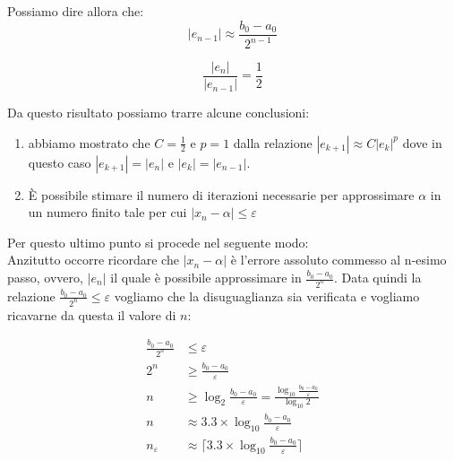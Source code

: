 \documentclass[12pt, a4paper]{book}
\theoremstyle{definition}
\begin{document}
\begin{flushleft}
Possiamo dire allora che: 
\[ 
	|e_{n-1}| \approx \frac{b_{0} - a_{0}}{2^{n-1}} 
\]

\[ 
	\dfrac{|e_{n}| }{|e_{n-1}| } = \frac{1}{2}
\]

Da questo risultato possiamo trarre alcune conclusioni: 
\begin{enumerate}
	\item abbiamo mostrato che $C = \frac{1}{2}$ e $p = 1$ dalla relazione $|e_{k+1}| \approx C|e_{k}|^{p}$ dove in questo caso $|e_{k+1}| = |e_{n}| $ e $|e_{k}| = |e_{n-1}| $.
	\item È possibile stimare il numero di iterazioni necessarie per approssimare $\alpha$ in un numero finito tale per cui $|x_{n} - \alpha| \leq \varepsilon$
\end{enumerate}

Per questo ultimo punto si procede nel seguente modo:\\
Anzitutto occorre ricordare che $|x_{n} - \alpha|$ è l'errore assoluto commesso al n-esimo passo,  ovvero, $|e_{n}|$ il quale è possibile approssimare in  $ \frac{b_{0} - a_{0}}{2^{n}}$.  Data quindi la relazione $ \frac{b_{0} - a_{0}}{2^{n}} \leq \varepsilon$ vogliamo che la disuguaglianza sia verificata e vogliamo ricavarne da questa il valore di $n$:

\begin{equation}
	\begin{split}
		 \frac{b_{0} - a_{0}}{2^{n}} & \leq \varepsilon \\
		 2^{n} & \geq  \frac{b_{0} - a_{0}}{\varepsilon} \\
		 n & \geq \log_{2}  \frac{b_{0} - a_{0}}{\varepsilon} = \frac{ \log_{10} \frac{b_{0} - a_{0}}{\varepsilon} }{ \log_{10} 2} \\
		 n & \approx 3.3 \times  \log_{10} \frac{b_{0} - a_{0}}{\varepsilon} \\
		 n_{\varepsilon} & \approx \lceil 3.3 \times  \log_{10} \frac{b_{0} - a_{0}}{\varepsilon} \rceil
	\end{split}
\end{equation}
\end{flushleft}
\end{document}
